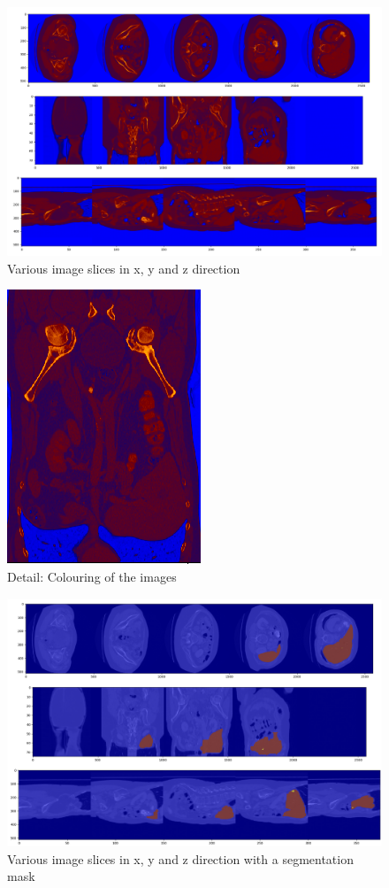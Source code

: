 \documentclass{article}
\begin{document}
			\begin{figure}[tbp]
				\centering
				\includegraphics[width=.6\textwidth]{images/image_slices}
				\caption{Various image slices in x, y and z direction}
				\label{fig:figure1}
			\end{figure}
			\begin{figure}[tbp]
				\centering
				\includegraphics[width=.6\textwidth]{images/image}
				\caption{Detail: Colouring of the images}
				\label{fig:figure2}
			\end{figure}
			\begin{figure}[tbp]
				\centering
				\includegraphics[width=.6\textwidth]{images/image+labels_slices}
				\caption{Various image slices in x, y and z direction with a segmentation mask}
				\label{fig:figure3}
			\end{figure}
\end{document}
